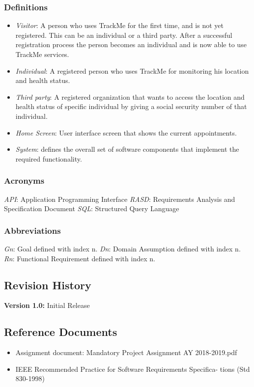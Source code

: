 \documentclass[12pt]{article}
\begin{document}
\subsubsection{Definitions}
\begin{itemize}
\item \textit{Visitor}: A person who uses TrackMe for the first time, and is not yet registered. This can be an individual or a third party. After a successful registration process the person becomes an individual and is now able to use TrackMe services.
\item \textit{Individual}: A registered person who uses TrackMe for monitoring his location and health status.
\item \textit{Third party}: A registered organization that wants to access the location and health status of specific individual by giving a social security number of that individual.
\item \textit{Home Screen}: User interface screen that shows the current appointments.

\item \textit{System}: defines the overall set of software components that implement the required functionality.
\end{itemize}


\subsubsection{Acronyms}
\textit{API}: Application Programming Interface\newline
\textit{RASD}: Requirements Analysis and Specification Document\newline
\textit{SQL}: Structured Query Language\newline
\subsubsection{Abbreviations}
\textit{Gn}: Goal defined with index n.\newline
\textit{Dn}: Domain Assumption defined with index n.\newline
\textit{Rn}: Functional Requirement defined with index n.
\subsection{Revision History}
\textbf{Version 1.0:} Initial Release
\newpage
\subsection{Reference Documents}
\begin{itemize}
\item Assignment document: Mandatory Project Assignment AY 2018-2019.pdf
\item IEEE Recommended Practice for Software Requirements Specifica- tions (Std 830-1998)
\end{itemize}
\end{document}
